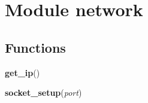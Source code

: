%
%
%


\section{Module network}

    \label{network}


  \subsection{Functions}

    \label{network:get_ip}

    \vspace{0.5ex}

\hspace{.8\funcindent}\begin{boxedminipage}{\funcwidth}

    \raggedright \textbf{get\_ip}()

\setlength{\parskip}{2ex}
\setlength{\parskip}{1ex}
    \end{boxedminipage}

    \label{network:socket_setup}

    \vspace{0.5ex}

\hspace{.8\funcindent}\begin{boxedminipage}{\funcwidth}

    \raggedright \textbf{socket\_setup}(\textit{port})

\setlength{\parskip}{2ex}
\setlength{\parskip}{1ex}
    \end{boxedminipage}



